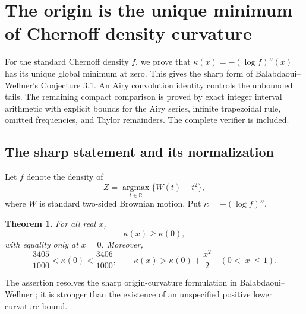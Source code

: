 \documentclass[11pt,a4paper]{article}
\numberwithin{equation}{section}
\newtheorem{theorem}{Theorem}[section]
\theoremstyle{definition}
\theoremstyle{remark}
\newenvironment{sectionabstract}{\par\smallskip\begingroup\small\noindent}{\par\endgroup\medskip}
\begin{document}
\par\endgroup

\begingroup

\clearpage
\section{\texorpdfstring{The origin is the unique minimum of Chernoff density curvature}{The origin is the unique minimum of Chernoff density curvature}}\label{section:add49heisei}
\par\medskip


\begin{sectionabstract}
For the standard Chernoff density $f$, we prove that
$\kappa(x)=-(\log f)''(x)$ has its unique global minimum at zero.
This gives the sharp form of Balabdaoui--Wellner's Conjecture 3.1.
An Airy convolution identity controls the unbounded tails. The remaining
compact comparison is proved by exact integer interval arithmetic with
explicit bounds for the Airy series, infinite trapezoidal rule, omitted
frequencies, and Taylor remainders. The complete verifier is included.
\end{sectionabstract}

\subsection{The sharp statement and its normalization}
Let $f$ denote the density of
\[
 Z=\operatorname*{argmax}_{t\in\mathbb R}\{W(t)-t^2\},
\]
where $W$ is standard two-sided Brownian motion. Put
$\kappa=-(\log f)''$.
\begin{theorem}\label{add49heisei:thm:sharp}
For all real $x$,
\[
 \kappa(x)\ge\kappa(0),
\]
with equality only at $x=0$. Moreover,
\[
 \frac{3405}{1000}<\kappa(0)<\frac{3406}{1000},\qquad
 \kappa(x)>\kappa(0)+\frac{x^2}{2}\quad(0<|x|\le1).
\]
\end{theorem}
The assertion resolves the sharp origin-curvature formulation in
Balabdaoui--Wellner \cite[Conjecture 3.1]{add49heisei:bw}; it is stronger than the
existence of an unspecified positive lower curvature bound.
\end{document}
